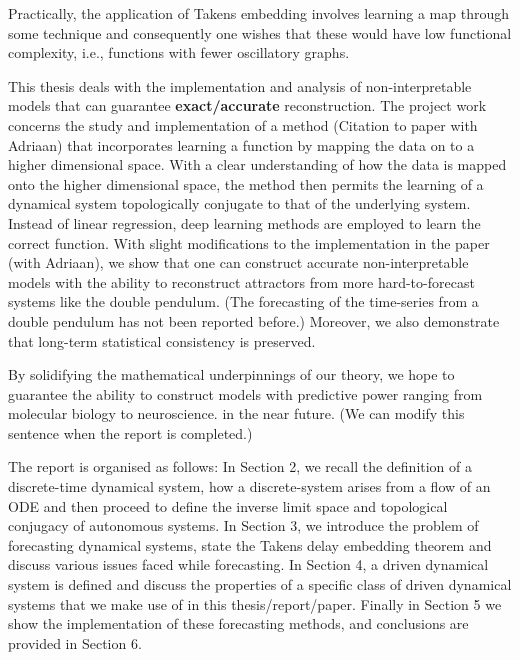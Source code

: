 \documentclass[12 pt]{article}
\begin{document}
Practically, the application of Takens embedding involves learning a map through some technique and consequently one wishes that these would have low functional complexity\cite{manjunath2021universal}, i.e., functions with fewer oscillatory graphs.

This thesis deals with the implementation and analysis of non-interpretable models that can guarantee \textbf{exact/accurate} reconstruction. The project work concerns the study and implementation of a method (Citation to paper with Adriaan) that incorporates learning a function by mapping the data on to a higher dimensional space. With a clear understanding of how the data is mapped onto the higher dimensional space, the method then permits the learning of a dynamical system topologically conjugate to that of the underlying system. Instead of linear regression, deep learning methods are employed to learn the correct function. With slight modifications to the implementation in the paper (with Adriaan), we show that one can construct accurate non-interpretable models with the ability to reconstruct attractors from more hard-to-forecast systems like the double pendulum. (The forecasting of the time-series from a double pendulum has not been reported before.) Moreover, we also demonstrate that long-term statistical consistency is preserved.

By solidifying the mathematical underpinnings of our theory, we hope to guarantee the ability to construct models with predictive power ranging from molecular biology to neuroscience. in the near future. (We can modify this sentence when the report is completed.)

The report is organised as follows: 
\newline In Section 2, we recall the definition of a discrete-time dynamical system, how a discrete-system arises from a flow of an ODE and then proceed to define the inverse limit space and topological conjugacy of autonomous systems. 
\newline In Section 3, we introduce the problem of forecasting dynamical systems, state the Takens delay embedding theorem and discuss various issues faced while forecasting. 
\newline In Section 4, a driven dynamical system is defined and discuss the properties of a specific class of driven dynamical systems that we make use of in this thesis/report/paper. 
\newline Finally in Section 5 we show the implementation of these forecasting methods, and conclusions are provided in Section 6.
\end{document}
